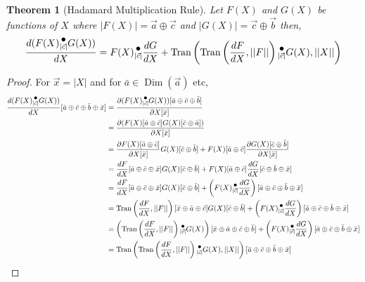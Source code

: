 \documentclass[12pt]{book}
\theoremstyle{plain}
\newtheorem{theorem}{Theorem}[chapter]
\theoremstyle{definition}
\theoremstyle{ppart}
\theoremstyle{case}
\theoremstyle{solution}
\DeclareMathOperator{\Dim}{Dim}
\DeclareMathOperator{\Tran}{Tran}
\newcommand{\dmult}[1]{\text{\raisebox{1ex}{$\underset{#1}{\,\bullet\,}$}}}
\newcommand{\shape}[1]{\left|#1\right|}
\begin{document}
\begin{theorem}[Hadamard Multiplication Rule]
Let $F(X)$ and $G(X)$ be functions of $X$ where
$\shape{F(X)} = \vec{a} \oplus \vec{c}$ and $\shape{G(X)} = \vec{c} \oplus \vec{b}$
then,
\[
  \frac{d(F(X) \dmult{\shape{\vec{c}}} G(X))}{dX} =
    F(X) \dmult{\shape{\vec{c}}} \frac{dG}{dX} +
    \Tran\left(\Tran\left(\frac{dF}{dX}, \shape{\shape{F}}\right) \dmult{\shape{\vec{c}}} G(X), \shape{\shape{X}}\right)
\]
\end{theorem}
\begin{landscape}
\begin{proof}
For $\vec{x} = \shape{X}$ and for $\bar{a} \in \Dim(\vec{a})$ etc,
\begin{align*}
\frac{d(F(X) \dmult{\shape{\vec{c}}} G(X))}{dX}[\bar{a} \oplus \bar{c} \oplus \bar{b} \oplus \bar{x}]
  &= \frac{\partial (F(X) \dmult{\shape{\vec{c}}} G(X))[\bar{a} \oplus \bar{c} \oplus \bar{b}]}{\partial X[\bar{x}]} \\
  &= \frac{\partial (F(X)[\bar{a} \oplus \bar{c}] G(X)[\bar{c} \oplus \bar{a}])}{\partial X[\bar{x}]} \\
  &= \frac{\partial F(X)[\bar{a} \oplus \bar{c}]}{\partial X[\bar{x}]} G(X)[\bar{c} \oplus \bar{b}]
    + F(X)[\bar{a} \oplus \bar{c}] \frac{\partial G(X)[\bar{c} \oplus \bar{b}]}{\partial X[\bar{x}]} \\
  &= \frac{dF}{dX}[\bar{a} \oplus \bar{c} \oplus \bar{x}] G(X)[\bar{c} \oplus \bar{b}]
    + F(X)[\bar{a} \oplus \bar{c}] \frac{dG}{dX}[\bar{c} \oplus \bar{b} \oplus \bar{x}] \\
  &= \frac{dF}{dX}[\bar{a} \oplus \bar{c} \oplus \bar{x}] G(X)[\bar{c} \oplus \bar{b}]
    + \left(F(X) \dmult{\shape{\vec{c}}} \frac{dG}{dX}\right)[\bar{a} \oplus \bar{c} \oplus \bar{b} \oplus \bar{x}] \\
  &= \Tran\left(\frac{dF}{dX}, \shape{\shape{F}}\right)[\bar{x} \oplus \bar{a} \oplus \bar{c}] G(X)[\bar{c} \oplus \bar{b}]
    + \left(F(X) \dmult{\shape{\vec{c}}} \frac{dG}{dX}\right)[\bar{a} \oplus \bar{c} \oplus \bar{b} \oplus \bar{x}] \\
  &= \left(\Tran\left(\frac{dF}{dX}, \shape{\shape{F}}\right) \dmult{\shape{\vec{c}}} G(X)\right) [\bar{x} \oplus \bar{a} \oplus \bar{c} \oplus \bar{b}]
    + \left(F(X) \dmult{\shape{\vec{c}}} \frac{dG}{dX}\right)[\bar{a} \oplus \bar{c} \oplus \bar{b} \oplus \bar{x}] \\
  &= \Tran\left(\Tran\left(\frac{dF}{dX}, \shape{\shape{F}}\right) \dmult{\shape{\vec{c}}} G(X), \shape{\shape{X}}\right) [\bar{a} \oplus \bar{c} \oplus \bar{b} \oplus \bar{x}]

\end{align*}
\end{proof}
\end{landscape}
\end{document}
